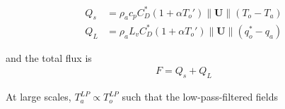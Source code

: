 \documentclass[12pt,a4paper]{article}
\newcommand{\Vmag}[1]{\| \mathbf{#1}\|}
\begin{document}
\begin{align}
Q_s &= \rho_a c_p C_D^*(1+\alpha T_o') \Vmag{U} (T_o-T_a)\\
Q_L &= \rho_a L_v C_D^*(1+\alpha T_o') \Vmag{U} (q_o^*-q_a)
\end{align}

and the total flux is 
\begin{align}
F = Q_s + Q_L
\end{align}


At large scales, $T_a^{LP} \propto T_o^{LP}$ such that the low-pass-filtered fields
\end{document}
